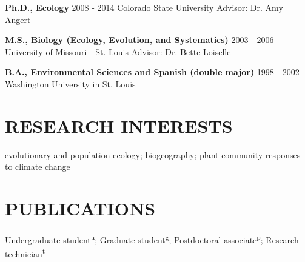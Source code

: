 \documentclass[11pt,english]{article}
\begin{document}
\begin{flushleft}
{\bf Ph.D., Ecology} \hfill {2008 - 2014} \newline
Colorado State University \newline
Advisor: Dr. Amy Angert
\vspace{0.5ex}

{\bf M.S., Biology (Ecology, Evolution, and Systematics)} \hfill {2003 - 2006} \newline
University of Missouri - St. Louis \newline
Advisor: Dr. Bette Loiselle
\vspace{0.5ex}

{\bf B.A., Environmental Sciences and Spanish (double major)} \hfill {1998 - 2002} \newline
Washington University in St. Louis
\end{flushleft}



\section*{RESEARCH INTERESTS}
\vspace{-0.5ex}

evolutionary and population ecology; biogeography; plant community responses to climate change


\vspace{1ex}
\section*{PUBLICATIONS}
\vspace{-0.5ex}

Undergraduate student\textsuperscript{u}; Graduate student\textsuperscript{g}; Postdoctoral associate\textsuperscript{p}; Research technician\textsuperscript{t} 
\end{document}
